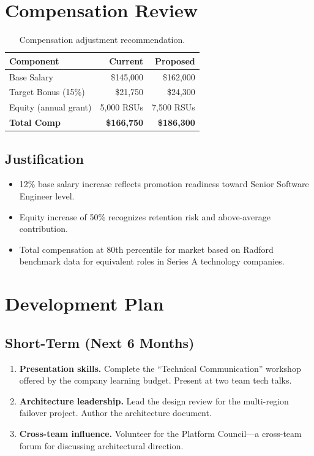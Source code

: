\documentclass[
    language=english,
    doctype=performance-review,
    institution=none,
]{../../omnilatex}
\begin{document}
\section{Compensation Review}

\begin{table}[h]
    \centering
    \begin{tabular}{lrr}
        \toprule
        \textbf{Component} & \textbf{Current} & \textbf{Proposed} \\
        \midrule
        Base Salary       & \$145,000 & \$162,000 \\
        Target Bonus (15\%) & \$21,750 & \$24,300 \\
        Equity (annual grant) & 5,000 RSUs & 7,500 RSUs \\
        \midrule
        \textbf{Total Comp} & \textbf{\$166,750} & \textbf{\$186,300} \\
        \bottomrule
    \end{tabular}
    \caption{Compensation adjustment recommendation.}
\end{table}

\subsection{Justification}

\begin{itemize}
    \item 12\% base salary increase reflects promotion readiness toward
          Senior Software Engineer level.
    \item Equity increase of 50\% recognizes retention risk and
          above-average contribution.
    \item Total compensation at 80th percentile for market based on
          Radford benchmark data for equivalent roles in Series A
          technology companies.
\end{itemize}

\section{Development Plan}

\subsection{Short-Term (Next 6 Months)}

\begin{enumerate}
    \item \textbf{Presentation skills.} Complete the ``Technical
        Communication'' workshop offered by the company learning budget.
        Present at two team tech talks.
    \item \textbf{Architecture leadership.} Lead the design review for the
        multi-region failover project. Author the architecture document.
    \item \textbf{Cross-team influence.} Volunteer for the Platform
        Council---a cross-team forum for discussing architectural
        direction.
\end{enumerate}
\end{document}
